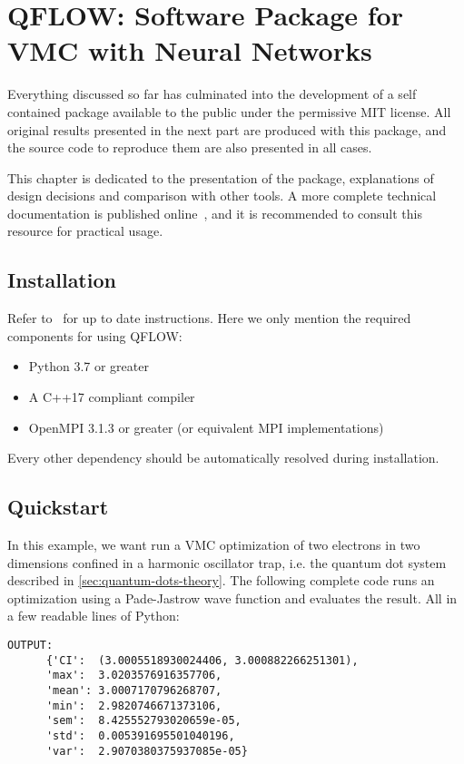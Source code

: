 \documentclass[Thesis.tex]{subfiles}
\begin{document}
\chapter{QFLOW: Software Package for VMC with Neural Networks}
\label{chp:qflow}

Everything discussed so far has culminated into the development of a self
contained package available to the public under the permissive MIT license. All
original results presented in the next part are produced with this package, and
the source code to reproduce them are also presented in all cases.

This chapter is dedicated to the presentation of the package, explanations of
design decisions and comparison with other tools. A more complete technical
documentation is published online~\cite{qflow}, and it is recommended to consult this
resource for practical usage.

\section{Installation}

Refer to~\cite{qflow} for up to date instructions. Here we only mention the
required components for using QFLOW:

\begin{itemize}
  \item Python 3.7 or greater
  \item A C++17 compliant compiler
  \item OpenMPI 3.1.3 or greater (or equivalent MPI implementations)
\end{itemize}
Every other dependency should be automatically resolved during installation.

\section{Quickstart}

In this example, we want run a VMC optimization of two electrons in two
dimensions confined in a harmonic oscillator trap, i.e. the quantum dot system
described in \cref{sec:quantum-dots-theory}. The following complete code runs an
optimization using a Pade-Jastrow wave function and evaluates the result. All in
a few readable lines of Python:\\



\begin{lstlisting}[basicstyle=\scriptsize]
  OUTPUT:
      {'CI':  (3.0005518930024406, 3.000882266251301),
      'max':  3.0203576916357706,
      'mean': 3.0007170796268707,
      'min':  2.9820746671373106,
      'sem':  8.425552793020659e-05,
      'std':  0.005391695501040196,
      'var':  2.9070380375937085e-05}
\end{lstlisting}
\end{document}
